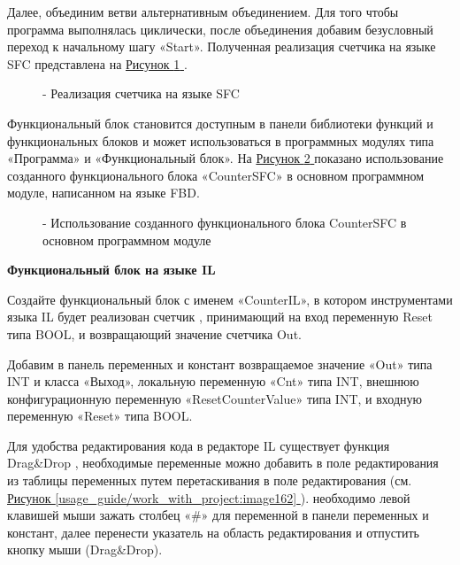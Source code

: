 \documentclass[letterpaper,10pt,russian]{sphinxmanual}
\begin{document}
Далее, объединим ветви альтернативным объединением. Для того чтобы
программа выполнялась циклически, после объединения добавим безусловный
переход к начальному шагу «Start». Полученная реализация счетчика на
языке SFC представлена на \hyperref[usage_guide/work_with_project:image179]{Рисунок \ref{usage_guide/work_with_project:image179} }.
\begin{figure}[htbp]
\centering
\capstart

\noindent{}
\caption{- Реализация счетчика на языке SFC}\label{usage_guide/work_with_project:image179}\end{figure}

Функциональный блок становится доступным в панели библиотеки функций и
функциональных блоков и может использоваться в программных
модулях типа «Программа» и «Функциональный блок». На
\hyperref[usage_guide/work_with_project:image180]{Рисунок \ref{usage_guide/work_with_project:image180} } показано
использование созданного функционального блока «CounterSFC» в основном
программном модуле, написанном на языке FBD.
\begin{figure}[htbp]
\centering
\capstart

\noindent{}
\caption{- Использование созданного функционального блока CounterSFC в основном программном модуле}\label{usage_guide/work_with_project:image180}\end{figure}

\textbf{Функциональный блок на языке IL}

Создайте функциональный блок с именем «CounterIL», в котором
инструментами языка IL будет реализован счетчик , принимающий на вход
переменную Reset типа BOOL, и возвращающий значение счетчика Out.

Добавим в панель переменных и констант возвращаемое значение «Out» типа
INT и класса «Выход», локальную переменную «Cnt» типа INT, внешнюю
конфигурационную переменную «ResetCounterValue» типа INT, и входную
переменную «Reset» типа BOOL.

Для удобства редактирования кода в редакторе IL существует функция
Drag\&Drop , необходимые переменные можно добавить в поле
редактирования из таблицы переменных путем перетаскивания в поле
редактирования (см. \hyperref[usage_guide/work_with_project:image162]{Рисунок \ref{usage_guide/work_with_project:image162} }). необходимо левой клавишей мыши зажать
столбец «\#» для переменной в панели переменных и констант, далее
перенести указатель на область редактирования и отпустить кнопку мыши
(Drag\&Drop).
\end{document}
